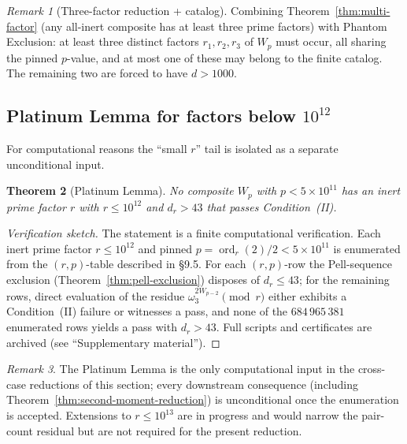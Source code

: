 \documentclass[12pt]{article}
\theoremstyle{plain}
\newtheorem{theorem}{Theorem}[section]
\theoremstyle{definition}
\theoremstyle{remark}
\newtheorem{remark}[theorem]{Remark}
\begin{document}
\begin{remark}[Three-factor reduction + catalog]
Combining Theorem~\ref{thm:multi-factor} (any all-inert composite
has at least three prime factors) with Phantom Exclusion: at least
three distinct factors \(r_1, r_2, r_3\) of \(W_p\) must occur,
all sharing the pinned \(p\)-value, and at most one of these may
belong to the finite catalog. The remaining two are forced to
have \(d > 1000\).
\end{remark}

\subsection{Platinum Lemma for factors below \texorpdfstring{$10^{12}$}{10\textasciicircum 12}}

For computational reasons the ``small \(r\)'' tail is isolated as
a separate unconditional input.

\begin{theorem}[Platinum Lemma]\label{thm:platinum}
No composite \(W_p\) with \(p < 5 \times 10^{11}\) has an inert
prime factor \(r\) with \(r \leq 10^{12}\) and
\(d_r > 43\) that passes Condition~(II).
\end{theorem}

\begin{proof}[Verification sketch]
The statement is a finite computational verification. Each inert
prime factor \(r \leq 10^{12}\) and pinned \(p =
\operatorname{ord}_r(2)/2 < 5 \times 10^{11}\) is enumerated from
the \((r, p)\)-table described in \S9.5. For each \((r, p)\)-row
the Pell-sequence exclusion
(Theorem~\ref{thm:pell-exclusion}) disposes of \(d_r \leq 43\); for
the remaining rows, direct evaluation of the residue
\(\omega_3^{2 W_{p-2}} \pmod r\) either exhibits a
Condition~(II) failure or witnesses a pass, and none of the
\(684\,965\,381\) enumerated rows yields a pass with
\(d_r > 43\). Full scripts and certificates are archived
(see ``Supplementary material'').
\end{proof}

\begin{remark}
The Platinum Lemma is the only computational input in the
cross-case reductions of this section; every downstream
consequence (including
Theorem~\ref{thm:second-moment-reduction}) is unconditional once
the enumeration is accepted. Extensions to \(r \leq 10^{13}\) are
in progress and would narrow the pair-count residual but are not
required for the present reduction.
\end{remark}
\end{document}
